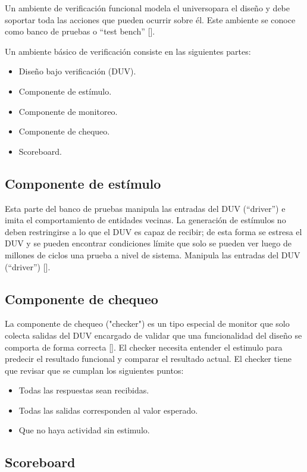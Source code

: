 Un ambiente de verificación funcional modela el universopara el diseño y debe soportar toda las acciones que pueden ocurrir sobre él. Este ambiente se conoce como banco de pruebas o “test bench” [\cite{Wile}].

Un ambiente básico de verificación consiste en las siguientes partes:

\begin{itemize}
\item Diseño bajo verificación (DUV).
\item Componente de estímulo.
\item Componente de monitoreo.
\item Componente de chequeo.
\item Scoreboard.
\end{itemize}

\subsection{Componente de estímulo}

Esta parte del banco de pruebas manipula las entradas del DUV (“driver”) e imita el comportamiento de entidades vecinas.
La generación de estímulos no deben restringirse
a lo que el DUV es capaz de recibir; de esta forma se estresa el DUV y se pueden encontrar condiciones límite que solo se pueden ver luego de millones de ciclos una prueba a nivel de sistema. Manipula las entradas del DUV (“driver”) [\cite{Wile}].

\subsection{Componente de chequeo}

La componente  de chequeo ("checker") es un tipo especial de monitor que solo colecta salidas del DUV encargado de validar que una funcionalidad del diseño se comporta de forma correcta [\cite{Wile}].
El checker necesita entender el estimulo para predecir el resultado funcional y comparar el resultado actual.
El checker tiene que revisar que se cumplan los siguientes puntos:
\begin{itemize}
\item Todas las respuestas sean recibidas.
\item Todas las salidas corresponden al valor esperado.
\item Que no haya actividad sin estimulo.
\end{itemize}

\subsection{Scoreboard}

